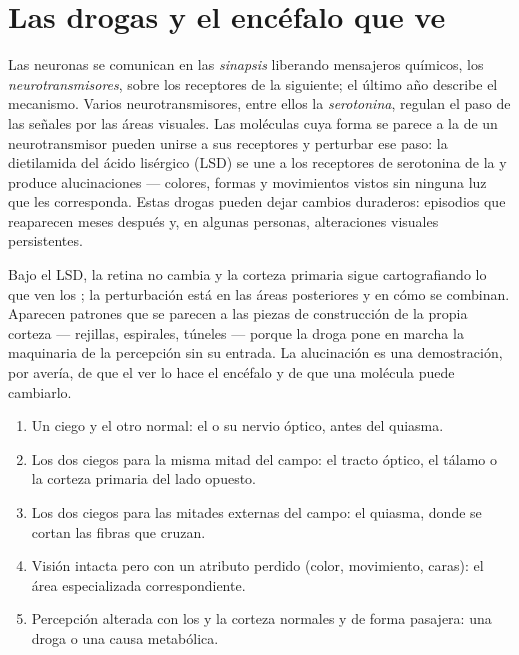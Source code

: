\section{Las drogas y el encéfalo que ve}

\begin{proposition}\label{prop:g11:vision-and-brain:drugs}
Las neuronas se comunican en las \emph{sinapsis} liberando mensajeros
químicos, los \emph{neurotransmisores}, sobre los receptores de la
 siguiente; el último año describe el mecanismo. Varios
neurotransmisores, entre ellos la \emph{serotonina}, regulan el paso de
las señales por las áreas visuales. Las moléculas cuya forma se parece
a la de un neurotransmisor pueden unirse a sus receptores y perturbar
ese paso: la dietilamida del ácido lisérgico (LSD) se une a los
receptores de serotonina de la  y produce alucinaciones
--- colores, formas y movimientos vistos sin ninguna luz que les
corresponda. Estas drogas pueden dejar cambios duraderos: episodios que
reaparecen meses después y, en algunas personas, alteraciones visuales
persistentes.
\end{proposition}
\admitted

\begin{example}\label{ex:g11:vision-and-brain:hallucination}
Bajo el LSD, la retina no cambia y la corteza primaria sigue
cartografiando lo que ven los ; la perturbación está en las áreas
posteriores y en cómo se combinan. Aparecen patrones que se parecen a
las piezas de construcción de la propia corteza --- rejillas,
espirales, túneles --- porque la droga pone en marcha la maquinaria de
la percepción sin su entrada. La alucinación es una demostración, por
avería, de que el ver lo hace el encéfalo y de que una molécula puede
cambiarlo.
\end{example}

\begin{method}\label{met:g11:vision-and-brain:locate}
\begin{enumerate}
  \item Un  ciego y el otro normal: el  o su nervio óptico, antes
        del quiasma.
  \item Los dos  ciegos para la misma mitad del campo: el tracto
        óptico, el tálamo o la corteza primaria del lado opuesto.
  \item Los dos  ciegos para las mitades externas del campo: el
        quiasma, donde se cortan las fibras que cruzan.
  \item Visión intacta pero con un atributo perdido (color, movimiento,
        caras): el área especializada correspondiente.
  \item Percepción alterada con los  y la corteza normales y de
        forma pasajera: una droga o una causa metabólica.
\end{enumerate}
\end{method}

